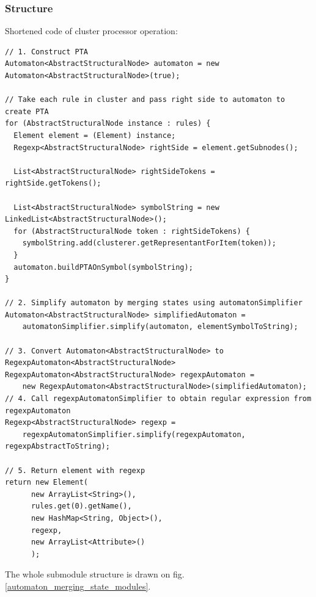 \documentclass[a4paper,10pt,oneside]{article}
\begin{document}
\subsubsection{Structure} \label{section_AutomatonMergingState_structure}
Shortened code of cluster processor operation:
\begin{verbatim}
// 1. Construct PTA
Automaton<AbstractStructuralNode> automaton = new Automaton<AbstractStructuralNode>(true);

// Take each rule in cluster and pass right side to automaton to create PTA
for (AbstractStructuralNode instance : rules) {
  Element element = (Element) instance;
  Regexp<AbstractStructuralNode> rightSide = element.getSubnodes();

  List<AbstractStructuralNode> rightSideTokens = rightSide.getTokens();

  List<AbstractStructuralNode> symbolString = new LinkedList<AbstractStructuralNode>();
  for (AbstractStructuralNode token : rightSideTokens) {
    symbolString.add(clusterer.getRepresentantForItem(token));
  }
  automaton.buildPTAOnSymbol(symbolString);
}

// 2. Simplify automaton by merging states using automatonSimplifier
Automaton<AbstractStructuralNode> simplifiedAutomaton =
    automatonSimplifier.simplify(automaton, elementSymbolToString);

// 3. Convert Automaton<AbstractStructuralNode> to RegexpAutomaton<AbstractStructuralNode>
RegexpAutomaton<AbstractStructuralNode> regexpAutomaton =
    new RegexpAutomaton<AbstractStructuralNode>(simplifiedAutomaton);
// 4. Call regexpAutomatonSimplifier to obtain regular expression from regexpAutomaton
Regexp<AbstractStructuralNode> regexp =
    regexpAutomatonSimplifier.simplify(regexpAutomaton, regexpAbstractToString);

// 5. Return element with regexp
return new Element(
      new ArrayList<String>(),
      rules.get(0).getName(),
      new HashMap<String, Object>(),
      regexp,
      new ArrayList<Attribute>()
      );
\end{verbatim}
The whole submodule structure is drawn on fig. \ref{automaton_merging_state_modules}.
\end{document}
